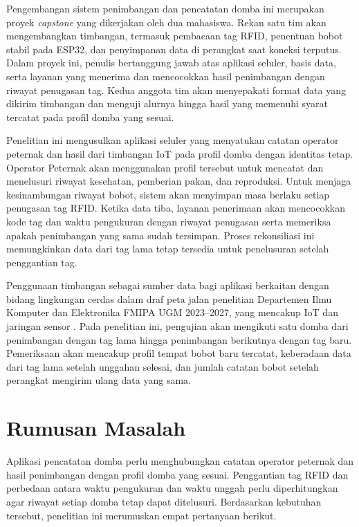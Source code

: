 \begin{sesudahrevisi}
Pengembangan sistem penimbangan dan pencatatan domba ini merupakan proyek
\textit{capstone} yang dikerjakan oleh dua mahasiswa. Rekan satu tim akan
mengembangkan timbangan, termasuk pembacaan tag RFID, penentuan bobot stabil
pada ESP32, dan penyimpanan data di perangkat saat koneksi terputus.
Dalam proyek ini, penulis bertanggung jawab atas aplikasi seluler, basis data,
serta layanan yang menerima dan mencocokkan hasil penimbangan dengan riwayat
penugasan tag. Kedua anggota tim akan menyepakati format data yang dikirim
timbangan dan menguji alurnya hingga hasil yang memenuhi syarat tercatat pada
profil domba yang sesuai.
\end{sesudahrevisi}

Penelitian ini mengusulkan aplikasi seluler yang menyatukan catatan {\setlength{\fboxsep}{1pt}\colorbox{revisilama}{operator}} {\setlength{\fboxsep}{1pt}\colorbox{revisibaru}{peternak}}
dan hasil dari timbangan IoT pada profil domba dengan identitas tetap.
{\setlength{\fboxsep}{1pt}\colorbox{revisilama}{Operator}} {\setlength{\fboxsep}{1pt}\colorbox{revisibaru}{Peternak}} akan menggunakan profil tersebut untuk mencatat dan menelusuri
riwayat kesehatan, pemberian pakan, dan reproduksi. Untuk menjaga
kesinambungan riwayat bobot, sistem akan menyimpan masa berlaku setiap
penugasan tag RFID. Ketika data tiba, layanan penerimaan akan mencocokkan
kode tag dan waktu pengukuran dengan riwayat penugasan serta memeriksa apakah
penimbangan yang sama sudah tersimpan. Proses rekonsiliasi ini memungkinkan
data dari tag lama tetap tersedia untuk penelusuran setelah penggantian tag.

Penggunaan timbangan sebagai sumber data bagi aplikasi berkaitan dengan
bidang lingkungan cerdas dalam draf peta jalan penelitian Departemen Ilmu
Komputer dan Elektronika FMIPA UGM 2023--2027, yang mencakup IoT dan
jaringan sensor \citep[hlm.~22]{dike2023petajalan}. Pada penelitian ini,
pengujian akan mengikuti satu domba dari penimbangan dengan tag lama hingga
penimbangan berikutnya dengan tag baru. Pemeriksaan akan mencakup profil
tempat bobot baru tercatat, keberadaan data dari tag lama setelah unggahan
selesai, dan jumlah catatan bobot setelah perangkat mengirim ulang data yang
sama.

\section{Rumusan Masalah}

Aplikasi pencatatan domba perlu menghubungkan catatan {\setlength{\fboxsep}{1pt}\colorbox{revisilama}{operator}} {\setlength{\fboxsep}{1pt}\colorbox{revisibaru}{peternak}} dan hasil
penimbangan dengan profil domba yang sesuai. Penggantian tag RFID dan
perbedaan antara waktu pengukuran dan waktu unggah perlu diperhitungkan agar
riwayat setiap domba tetap dapat ditelusuri. Berdasarkan kebutuhan tersebut,
penelitian ini merumuskan empat pertanyaan berikut.

